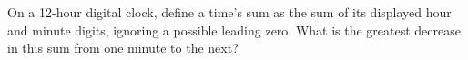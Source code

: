 On a 12-hour digital clock, define a time's sum as the sum of its displayed hour and minute digits, ignoring a possible leading zero. What is the greatest decrease in this sum from one minute to the next?

